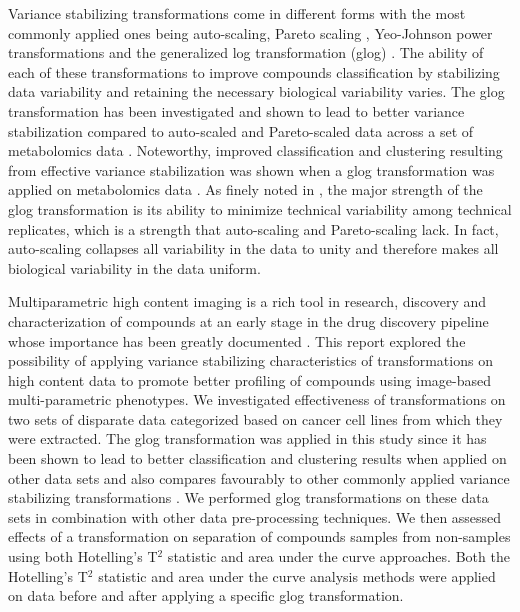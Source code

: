 \documentclass[11pt]{article}
\begin{document}
\par{Variance stabilizing transformations come in different forms with the most commonly applied ones being auto-scaling, Pareto scaling \cite{VandenBerg2006}, Yeo-Johnson power transformations \cite{yeo2000, Weisberg2001} and the generalized log transformation (glog) \cite{Huber2002, durbin2002variance, Rocke2003, Munson2001, Rocke2001}. The ability of each of these transformations to improve compounds classification by stabilizing data variability and retaining the necessary biological variability varies. The glog transformation has been investigated and shown to lead to better variance stabilization compared to auto-scaled and Pareto-scaled data across a set of metabolomics data \cite{Parsons2007}. Noteworthy, improved classification and clustering resulting from effective variance stabilization was shown when a glog transformation was applied on metabolomics data \cite{Purohit2004}. As finely noted in \cite{Parsons2007}, the major strength of the glog transformation is its ability to minimize technical variability among technical replicates, which is a strength that auto-scaling and Pareto-scaling lack. In fact, auto-scaling collapses all variability in the data to unity and therefore makes all biological variability in the data uniform. }

\par{Multiparametric high content imaging is a rich tool in research, discovery and characterization of compounds at an early stage in the drug discovery pipeline \cite{Price2002, Lang2006, Loo2007, Lin2007} whose importance has been greatly documented \cite{Reisen2015, Perlman2004}. This report explored the possibility of applying variance stabilizing characteristics of transformations on high content data to promote better profiling of compounds using image-based multi-parametric phenotypes. We investigated effectiveness of transformations on two sets of disparate data categorized based on cancer cell lines from which they were extracted. The glog transformation was applied in this study since it has been shown to lead to better classification and clustering results when applied on other data sets \cite{Purohit2004, Parsons2007} and also compares favourably to other commonly applied variance stabilizing transformations \cite{Parsons2007}. We performed glog transformations on these data sets in combination with other data pre-processing techniques. We then assessed effects of a transformation on separation of compounds samples from non-samples using both Hotelling's T$^2$ statistic and area under the curve approaches. Both the Hotelling's T$^2$ statistic and area under the curve analysis methods were applied on data before and after applying a specific glog transformation. }
\end{document}
